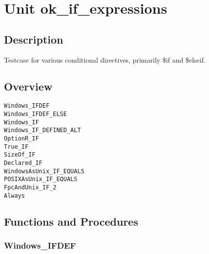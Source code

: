 \documentclass{report}
\newif\ifpdf
\begin{document}
\label{toc}\tableofcontents
\newpage
\newlength{\tmplength}
\chapter{Unit ok{\_}if{\_}expressions}
\label{ok_if_expressions}
\section{Description}
Testcase for various conditional directives, primarily {\$}if and {\$}elseif.
\section{Overview}
\begin{description}
\item[\texttt{Windows{\_}IFDEF}]
\item[\texttt{Windows{\_}IFDEF{\_}ELSE}]
\item[\texttt{Windows{\_}IF}]
\item[\texttt{Windows{\_}IF{\_}DEFINED{\_}ALT}]
\item[\texttt{OptionR{\_}IF}]
\item[\texttt{True{\_}IF}]
\item[\texttt{SizeOf{\_}IF}]
\item[\texttt{Declared{\_}IF}]
\item[\texttt{WindowsAsUnix{\_}IF{\_}EQUALS}]
\item[\texttt{POSIXAsUnix{\_}IF{\_}EQUALS}]
\item[\texttt{FpcAndUnix{\_}IF{\_}2}]
\item[\texttt{Always}]
\end{description}
\section{Functions and Procedures}
\ifpdf
\subsection*{\large{\textbf{Windows{\_}IFDEF}}\normalsize\hspace{1ex}\hrulefill}
\else
\end{document}
